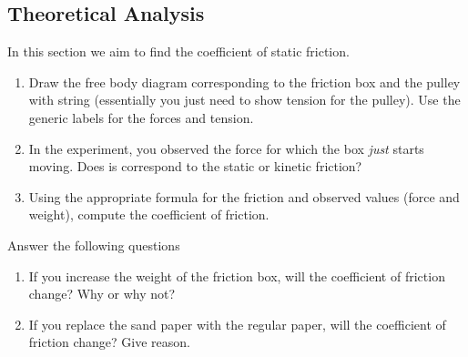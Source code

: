 \documentclass[10pt]{article}
\begin{document}
\subsection{Theoretical Analysis}
In this section we aim to find the coefficient of static friction.
\begin{enumerate}
\item Draw the free body diagram corresponding to the friction box and the pulley with string (essentially you just need to show tension for the pulley).  Use the generic labels for the forces and tension.
\vspace{250px}
\item In the experiment, you observed the force for which the box \emph{just} starts moving.  Does is correspond to the static or kinetic friction?  
\vspace{50px}
\item Using the appropriate formula for the friction and observed values (force and weight), compute the coefficient of friction.
\vspace{250px}  
\end{enumerate}
Answer the following questions
\begin{enumerate}
\item If you increase the weight of the friction box, will the coefficient of friction change?  Why or why not?
\vspace{100px}
\item If you replace the sand paper with the regular paper, will the coefficient of friction change?  Give reason.
\end{enumerate}
\end{document}
